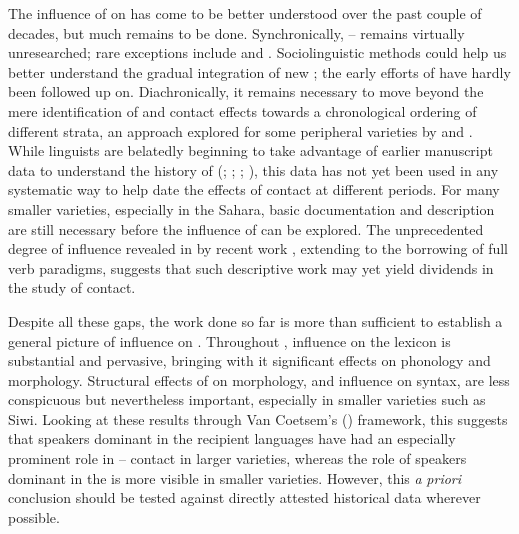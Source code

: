\documentclass[output=paper]{langsci/langscibook}
\begin{document}
The influence of  on  has come to be better understood over the past couple of decades, but much remains to be done.  Synchronically, –  remains virtually unresearched; rare exceptions include \citet{Hamza2007} and \citet{Kossmann2012}. Sociolinguistic methods could help us better understand the gradual integration of new  ; the early efforts of \citet{Brahimi2000} have hardly been followed up on. Diachronically, it remains necessary to move beyond the mere identification of  and contact effects towards a chronological ordering of different strata, an approach explored for some peripheral varieties by \citet{Souag2009} and \citet{vanPuttenBenkato2017}. While linguists are belatedly beginning to take advantage of earlier manuscript data to understand the history of  (\citealt{Boogert1997}; \citeyear{Boogert1998}; \citealt{Brugnatelli2011}; \citealt{Meouak2015}), this data has not yet been used in any systematic way to help date the effects of contact at different periods. For many smaller varieties, especially in the Sahara, basic documentation and description are still necessary before the influence of  can be explored. The unprecedented degree of  influence revealed in  by recent work \citep{Mourigh2016}, extending to the borrowing of full verb paradigms, suggests that such descriptive work may yet yield dividends in the study of contact.

Despite all these gaps, the work done so far is more than sufficient to establish a general picture of  influence on . Throughout  ,  influence on the lexicon is substantial and pervasive, bringing with it significant effects on phonology and morphology. Structural effects of  on morphology, and  influence on  syntax, are less conspicuous but nevertheless important, especially in smaller varieties such as Siwi. Looking at these results through Van Coetsem's (\citeyear{VanCoetsem1988,VanCoetsem2000}) framework, this suggests that speakers dominant in the recipient languages have had an especially prominent role in – contact in larger varieties, whereas the role of speakers dominant in the  is more visible in smaller varieties.  However, this \textit{a} \textit{priori} conclusion should be tested against directly attested historical data wherever possible.
\end{document}
